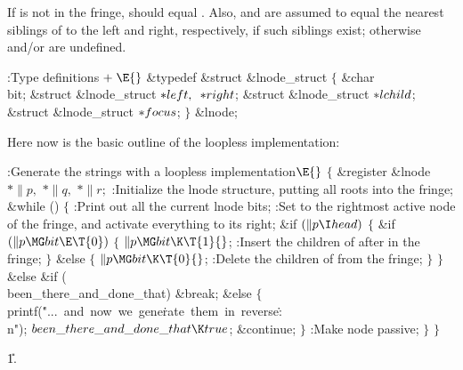 If  is not in the fringe,  should equal .
Also,  and  are assumed to
equal the nearest siblings of  to the left and right, respectively,
if such siblings exist; otherwise  and/or  are undefined.

\Y\B\4:Type definitions\X${}\mathrel+\E{}$\6
\&{typedef} \&{struct} \&{lnode\_struct} ${}\{{}$\1\6
\&{char} \\{bit};\6
\&{struct} \&{lnode\_struct} ${}{*}\\{left},{}$ ${}{*}\\{right}{}$;\6
\&{struct} \&{lnode\_struct} ${}{*}\\{lchild}{}$;\6
\&{struct} \&{lnode\_struct} ${}{*}\\{focus}{}$;\2\6
${}\}{}$ \&{lnode};\par
\fi

Here now is the basic outline of the loopless
implementation:

\Y\B\4:Generate the strings with a loopless implementation\X${}\E{}$\6
${}\{{}$\1\6
\&{register} \&{lnode} ${}{*}\|p,{}$ ${}{*}\|q,{}$ ${}{*}\|r;{}$\7
:Initialize the lnode structure, putting all roots into the fringe\X;\6
\&{while} ()\5
${}\{{}$\1\6
:Print out all the current lnode bits\X;\6
:Set  to the rightmost active node of the fringe, and activate
everything to its right\X;\6
\&{if} ${}(\|p\I\\{head}){}$\5
${}\{{}$\1\6
\&{if} ${}(\|p\MG\\{bit}\E\T{0}){}$\5
${}\{{}$\1\6
${}\|p\MG\\{bit}\K\T{1}{}$;\6
:Insert the children of  after  in the fringe\X;\6
\4${}\}{}$\5
\2\&{else}\5
${}\{{}$\1\6
${}\|p\MG\\{bit}\K\T{0}{}$;\6
:Delete the children of  from the fringe\X;\6
\4${}\}{}$\2\6
\4${}\}{}$\5
\2\&{else} \&{if} (\\{been\_there\_and\_done\_that})\1\5
\&{break};\2\6
\&{else}\5
${}\{{}$\1\6
\\{printf}(\.{"...\ and\ now\ we\ gene}\)\.{rate\ them\ in\ reverse}\)\.{:%
\\n"});\6
${}\\{been\_there\_and\_done\_that}\K\\{true}{}$;\5
\&{continue};\6
\4${}\}{}$\2\6
:Make node  passive\X;\6
\4${}\}{}$\2\6
\4${}\}{}$\2\par
\U1.\fi

